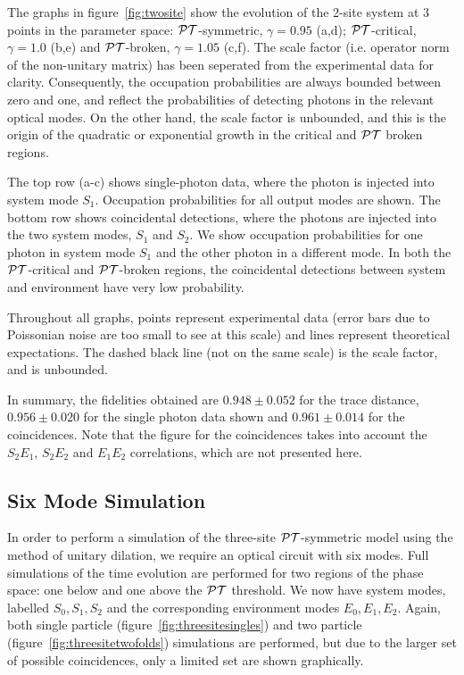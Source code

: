 The graphs in figure~\ref{fig:twosite} show the evolution of the 2-site system
at 3 points in the parameter space: \(\mathcal{PT}{}\)-symmetric, \(\gamma=0.95\) (a,d);
\(\mathcal{PT}{}\)-critical, \(\gamma=1.0\) (b,e) and \(\mathcal{PT}{}\)-broken, \(\gamma=1.05\)
(c,f). The scale factor (i.e. operator norm of the non-unitary matrix) has been
seperated from the experimental data for clarity. Consequently, the occupation
probabilities are always bounded between zero and one, and reflect the
probabilities of detecting photons in the relevant optical modes. On the other
hand, the scale factor is unbounded, and this is the origin of the quadratic or
exponential growth in the critical and \(\mathcal{PT}{}\) broken regions.

The top row (a-c) shows single-photon data, where the photon is injected into
system mode \(S_1\). Occupation probabilities for all output modes are shown.
The bottom row shows coincidental detections, where the photons are injected
into the two system modes, \(S_1\) and \(S_2\). We show occupation probabilities
for one photon in system mode \(S_1\) and the other photon in a different mode.
In both the \(\mathcal{PT}{}\)-critical and \(\mathcal{PT}{}\)-broken regions, the coincidental
detections between system and environment have very low probability.

Throughout all graphs, points represent experimental data (error bars due to
Poissonian noise are too small to see at this scale) and lines represent
theoretical expectations. The dashed black line (not on the same scale) is the
scale factor, and is unbounded.

In summary, the fidelities obtained are \(0.948 \pm 0.052\) for the trace
distance, \(0.956 \pm 0.020\) for the single photon data shown and \(0.961 \pm
0.014\) for the coincidences. Note that the figure for the coincidences takes
into account the \(S_2 E_1\), \(S_2 E_2\) and \(E_1 E_2\) correlations, which
are not presented here.

\subsection{Six Mode Simulation}
\label{sec:SixMode}
In order to perform a simulation of the three-site \(\mathcal{PT}\)-symmetric model using
the method of unitary dilation, we require an optical circuit with six modes.
Full simulations of the time evolution are performed for two regions of the
phase space: one below and one above the \(\mathcal{PT}\) threshold. We now have
system modes, labelled \(S_{0}, S_{1}, S_{2}\) and the corresponding environment
modes \(E_{0}, E_{1}, E_{2}\). Again, both single particle
(figure~\ref{fig:threesitesingles}) and two particle
(figure~\ref{fig:threesitetwofolds}) simulations are performed, but due to the
larger set of possible coincidences, only a limited set are shown graphically.


